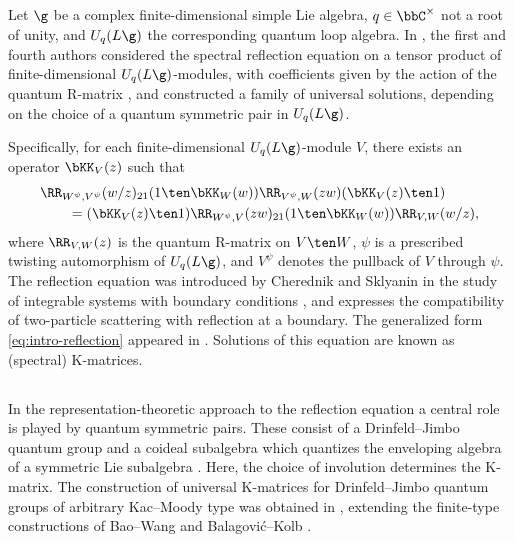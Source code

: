 \documentclass[reqno]{amsart}
\numberwithin{equation}{section}
\begin{document}
\subsection{}
Let $\g$ be a complex finite-dimensional simple Lie algebra, $q\in\bbC^\times$ not a 
root of unity, and $U_q(L\g)$ the corresponding quantum loop algebra.
In \cite{appel-vlaar-25a}, the first and fourth authors considered the spectral reflection 
equation on a tensor product of finite-dimensional $U_q(L\g)$-modules, 
with coefficients given by the action of the quantum R-matrix 
\cite{drinfeld-quantum-groups-87, frenkel-reshetikhin-92}, and constructed a family 
of universal solutions, depending on the choice of a quantum symmetric pair in 
$U_q(L\g)$.

Specifically, for each finite-dimensional $U_q(L\g)$-module $V$, there exists an 
operator $\bKK_V(z)$ such that
\begin{equation}\label{eq:intro-reflection}
	\begin{aligned}
		&\RR_{W^\psi,V^\psi}(w/z)_{21}(1\ten\bKK_W(w))
		\RR_{V^\psi,W}(zw)(\bKK_V(z)\ten1)\\
		&\qquad=(\bKK_V(z)\ten1)\RR_{W^\psi,V}(zw)_{21}
		(1\ten\bKK_W(w))\RR_{V,W}(w/z),
	\end{aligned}
\end{equation}
where $\RR_{V,W}(z)$ is the quantum R-matrix on $V\ten W$, $\psi$ is a prescribed twisting automorphism of $U_q(L\g)$, and $V^\psi$ denotes the pullback of $V$ through $\psi$.
The reflection equation was introduced by Cherednik and Sklyanin in the study of integrable systems with boundary conditions \cite{cherednik-84,sklyanin-88}, and expresses the compatibility of two-particle scattering with reflection at a boundary. 
The generalized form \eqref{eq:intro-reflection} appeared in \cite{cherednik-92}. Solutions of this equation are known as (spectral) K-matrices.

\subsection{}
In the representation-theoretic approach to the reflection equation a central role is played by quantum symmetric pairs.
These consist of a Drinfeld--Jimbo quantum group and a coideal subalgebra which quantizes the enveloping algebra of a symmetric Lie subalgebra \cite{letzter-02,kolb-14}.
Here, the choice of involution determines the K-matrix.
The construction of universal K-matrices for Drinfeld--Jimbo quantum groups of arbitrary Kac--Moody type was obtained in \cite{appel-vlaar-22}, extending the finite-type constructions of Bao--Wang \cite{bao-wang-18-kl} and Balagovi\'{c}--Kolb \cite{balagovic-kolb-19}. 
\end{document}
